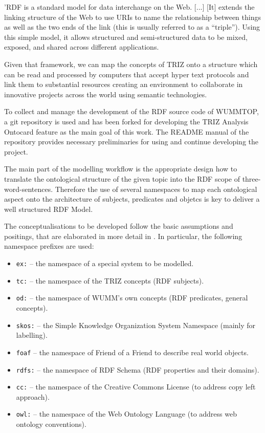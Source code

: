 \documentclass[a4paper,11pt]{article}
\begin{document}
    'RDF is a standard model for data interchange on the Web. [...] [It] 
    extends the linking structure of the Web to use URIs to name the relationship 
    between things as well as the two ends of the link 
    (this is usually referred to as a “triple”). Using this simple model, it allows 
    structured and semi-structured data to be mixed, exposed, and shared across 
    different applications. \cite{RDF}

    Given that framework, we can map the concepts of TRIZ onto a structure which can
    be read and processed by computers that accept hyper text protocols and link them
    to substantial resources creating an environment to collaborate 
    in innovative projects across the world using semantic technologies.
    
    To collect and manage the development of the RDF source code of WUMMTOP, a git 
    repository \cite{RDFData} is used and has been forked for developing the 
    TRIZ Analysis Ontocard feature as the main goal of this work. The README manual
    of the repository provides necessary preliminaries for using and continue developing 
    the project.
 
    The main part of the modelling workflow is the appropriate design how to translate 
    the ontological structure of the given topic into the RDF scope of three-word-sentences. 
    Therefore the use of several namespaces to map each ontological aspect onto the 
    architecture of subjects, predicates and objetcs is key to deliver a well structured 
    RDF Model. 

    The conceptualisations to be developed follow the basic assumptions and
    positings, that are elaborated in more detail in \cite{Graebe2021}. In
    particular, the following namespace prefixes are used:
    \begin{itemize}[noitemsep]
    \item \texttt{ex:} -- the namespace of a special system to be modelled. 
    \item \texttt{tc:} -- the namespace of the TRIZ concepts (RDF subjects).
    \item \texttt{od:} -- the namespace of WUMM's own concepts (RDF predicates,
    general concepts).
    \item \texttt{skos:} -- the Simple Knowledge Organization System Namespace (mainly for labelling).
    \item \texttt{foaf} -- the namespace of Friend of a Friend to describe real world objects.
    \item \texttt{rdfs:} -- the namespace of RDF Schema (RDF properties and their domains).
    \item \texttt{cc:} -- the namespace of the Creative Commons License (to address copy left approach).
    \item \texttt{owl:} -- the namespace of the Web Ontology Language (to address web ontology conventions).
    \end{itemize}
\end{document}
